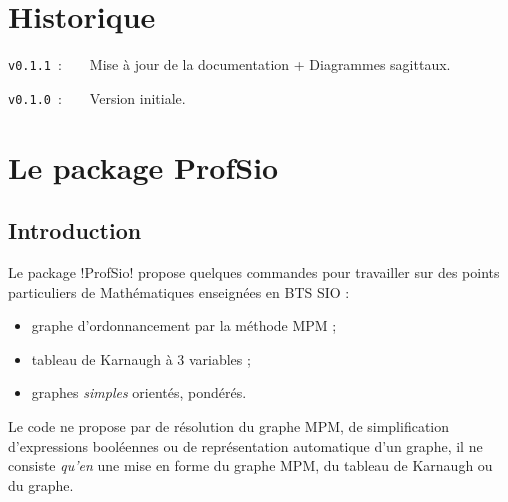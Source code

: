 \documentclass[french,a4paper,11pt]{article}
\providecommand\tikzlogo{Ti\textit{k}Z}
\providecommand\TeXLive{\TeX{}Live\xspace}
\let\TikZ\tikzlogo
\newcommand\TableauDocumentation{%
	\begin{tblr}{width=\linewidth,colspec={X[c]X[c]X[c]X[c]X[c]X[c]},cells={font=\large\sffamily}}
		{\LaTeX} & {\hologo{pdfLaTeX}} & {\hologo{LuaLaTeX}} & {\TikZ} & {\TeXLive} & {\hologo{MiKTeX}} \\
	\end{tblr}
}
\begin{document}
{%

%
%
%
%
%

\newpage

\hypertarget{matoc}{}

\tableofcontents

\vfill

\section{Historique}

\verb|v0.1.1|~:~~~~Mise à jour de la documentation + Diagrammes sagittaux.

\verb|v0.1.0|~:~~~~Version initiale.

\newpage

\section{Le package ProfSio}

\subsection{Introduction}

\begin{noteblock}
Le package \packagetex!ProfSio! propose quelques commandes pour travailler sur des points particuliers de Mathématiques enseignées en BTS SIO :

\begin{itemize}
	\item graphe d'ordonnancement par la méthode MPM ;
	\item tableau de Karnaugh à 3 variables ;
	\item graphes \textit{simples} orientés, pondérés.
\end{itemize}
\vspace*{-\baselineskip}\leavevmode
\end{noteblock}

\begin{warningblock}
Le code ne propose par de \og résolution \fg{} du graphe MPM, de \og simplification \fg{} d'expressions booléennes ou de représentation \og automatique \fg{} d'un graphe, il ne consiste \textit{qu'en} une mise en forme du graphe MPM, du tableau de Karnaugh ou du graphe.
\end{warningblock}

}
\end{document}
